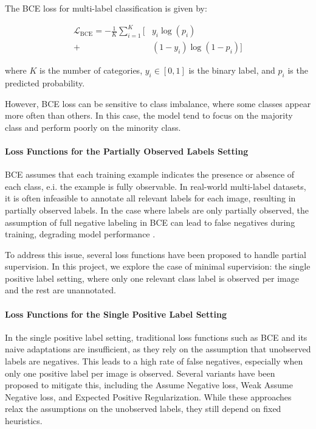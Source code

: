\documentclass[lettersize,journal]{IEEEtran}
\begin{document}
The BCE loss for multi-label classification is given by:

\begin{equation}
\begin{aligned}
\mathcal{L}_{\text{BCE}} = -\frac{1}{K} \sum_{i=1}^{K} \bigl[ &y_i\log(p_i) \\
+ &(1-y_i)\log(1 - p_i) \bigr]
\end{aligned}
\end{equation}

\noindent where $K$ is the number of categories, $y_i\in[0,1]$ is the binary label, and $p_i$ is the predicted probability.

However, BCE loss can be sensitive to class imbalance, where some classes appear more often than others. In this case, the model tend to focus on the majority class and perform poorly on the minority class. 

\paragraph{Loss Functions for the Partially Observed Labels Setting}
BCE assumes that each training example indicates the presence or absence of each class, e.i. the example is fully observable. In real-world multi-label datasets, it is often infeasible to annotate all relevant labels for each image, resulting in partially observed labels. In the case where labels are only partially observed, the assumption of full negative labeling in BCE can lead to false negatives during training, degrading model performance \cite{mlsp}. 

To address this issue, several loss functions have been proposed to handle partial supervision. In this project, we explore the case of minimal supervision: the single positive label setting, where only one relevant class label is observed per image and the rest are unannotated. 

\paragraph{Loss Functions for the Single Positive Label Setting}
In the single positive label setting, traditional loss functions such as BCE and its naive adaptations are insufficient, as they rely on the assumption that unobserved labels are negatives. This leads to a high rate of false negatives, especially when only one positive label per image is observed. Several variants have been proposed to mitigate this, including the Assume Negative loss, Weak Assume Negative loss, and Expected Positive Regularization. While these approaches relax the assumptions on the unobserved labels, they still depend on fixed heuristics.
\end{document}
